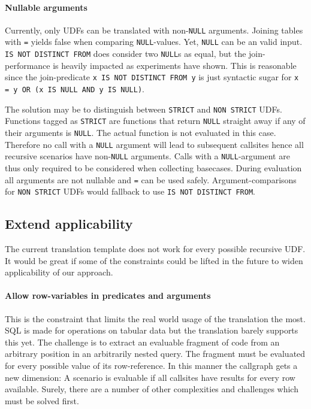\paragraph*{Nullable arguments}
Currently, only UDFs can be translated with non-\texttt{NULL} arguments. Joining tables with \texttt{=} yields false when comparing \texttt{NULL}-values. Yet, \texttt{NULL} can be an valid input. \texttt{IS NOT DISTINCT FROM} does consider two \texttt{NULL}s as equal, but the join-performance is heavily impacted as experiments have shown. This is reasonable since the join-predicate \texttt{x IS NOT DISTINCT FROM y} is just syntactic sugar for \texttt{x = y OR (x IS NULL AND y IS NULL)}.

The solution may be to distinguish between \texttt{STRICT} and \texttt{NON STRICT} UDFs. Functions tagged as \texttt{STRICT} are functions that return \texttt{NULL} straight away if any of their arguments is \texttt{NULL}. The actual function is not evaluated in this case. Therefore no call with a \texttt{NULL} argument will lead to subsequent callsites hence all recursive scenarios have non-\texttt{NULL} arguments. Calls with a \texttt{NULL}-argument are thus only required to be considered when collecting basecases. During evaluation all arguments are not nullable and \texttt{=} can be used safely. Argument-comparisons for \texttt{NON STRICT} UDFs would fallback to use \texttt{IS NOT DISTINCT FROM}.

\subsection{Extend applicability}

The current translation template does not work for every possible recursive UDF. It would be great if some of the constraints could be lifted in the future to widen applicability of our approach.

\paragraph*{Allow row-variables in predicates and arguments}
This is the constraint that limits the real world usage of the translation the most. SQL is made for operations on tabular data but the translation barely supports this yet. The challenge is to extract an evaluable fragment of code from an arbitrary position in an arbitrarily nested query. The fragment must be evaluated for every possible value of its row-reference. In this manner the callgraph gets a new dimension: A scenario is evaluable if all callsites have results for every row available. Surely, there are a number of other complexities and challenges which must be solved first.

